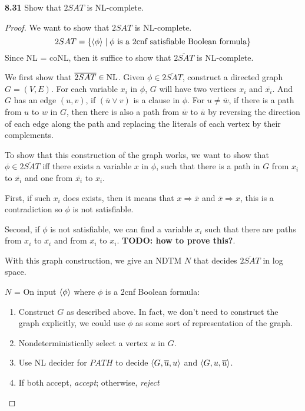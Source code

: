\label{lang:2SAT_NLC}
\textbf{8.31} Show that $2SAT$ is NL-complete.
\begin{mdframed}
\begin{proof}
We want to show that $2SAT$ is NL-complete.
\[
2SAT = \{\langle{\phi}\rangle \mid \phi \text{ is a 2cnf satisfiable Boolean formula} \}
\]
Since NL = coNL, then it suffice to show that $\overline{2SAT}$ is NL-complete. 

\medskip
We first show that $\overline{2SAT} \in \text{NL}$. Given $\phi \in \overline{2SAT}$, construct a directed graph $G = (V, E)$. For each variable $x_i$ in $\phi$, $G$ will have two vertices $x_i$ and $\overline{x_i}$. And $G$ has an edge $(u, v)$, if $(\overline{u} \vee v)$ is a clause in $\phi$. For $u \neq \overline{w}$, if there is a path from $u$ to $w$ in $G$, then there is also a path from $\overline{w}$ to $\overline{u}$ by reversing the direction of each edge along the path and replacing the literals of each vertex by their complements.

To show that this construction of the graph works, we want to show that $\phi \in \overline{2SAT}$ iff there exists a variable $x$ in $\phi$, such that there is a path in $G$ from $x_i$ to $\overline{x_i}$ and one from $\overline{x_i}$ to $x_i$.

First, if such $x_i$ does exists, then it means that $x \Rightarrow \overline{x}$ and $\overline{x} \Rightarrow x$, this is a contradiction so $\phi$ is not satisfiable.

Second, if $\phi$ is not satisfiable, we can find a variable $x_i$ such that there are paths from $x_i$ to $\overline{x_i}$ and from $\overline{x_i}$ to $x_i$. \textbf{TODO: how to prove this?}.

With this graph construction, we give an NDTM $N$ that decides $\overline{2SAT}$ in log space.

\medskip
$N$ = On input $\langle{\phi}\rangle$ where $\phi$ is a 2cnf Boolean formula:
\begin{enumerate}
\item Construct $G$ as described above. In fact, we don't need to construct the graph explicitly, we could use $\phi$ as some sort of representation of the graph.
\item Nondeterministically select a vertex $u$ in $G$.
\item Use NL decider for $PATH$ to decide $\langle{G, \overline{u}, u}\rangle$ and $\langle{G, u, \overline{u}}\rangle$.
\item If both accept, \textit{accept}; otherwise, \textit{reject}
\end{enumerate}


\end{proof}
\end{mdframed}
